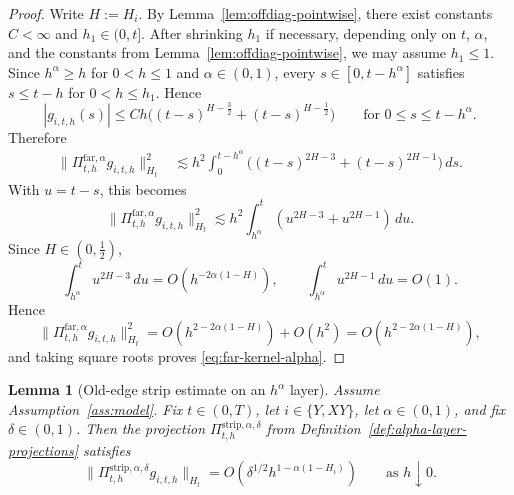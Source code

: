 \documentclass[11pt,a4paper]{amsart}
\theoremstyle{plain}
\newtheorem{lemma}[theorem]{Lemma}
\theoremstyle{definition}
\theoremstyle{remark}
\begin{document}
\begin{proof}
Write \(H:=H_i\). By Lemma~\ref{lem:offdiag-pointwise}, there exist constants
\(C<\infty\) and \(h_1\in(0,t]\). After shrinking \(h_1\) if necessary, depending only on
\(t\), \(\alpha\), and the constants from Lemma~\ref{lem:offdiag-pointwise}, we may assume
\(h_1\le1\). Since \(h^\alpha\ge h\) for \(0<h\le1\) and \(\alpha\in(0,1)\), every
\(s\in[0,t-h^\alpha]\) satisfies \(s\le t-h\) for \(0<h\le h_1\). Hence
\[
|g_{i,t,h}(s)|
\le
Ch\bigl((t-s)^{H-\frac32}+(t-s)^{H-\frac12}\bigr)
\qquad\text{for }0\le s\le t-h^\alpha.
\]
Therefore
\begin{align*}
\|\Pi_{t,h}^{\mathrm{far},\alpha}g_{i,t,h}\|_{H_t}^2
&\lesssim
h^2\int_0^{t-h^\alpha}
\bigl((t-s)^{2H-3}+(t-s)^{2H-1}\bigr)\,ds.
\end{align*}
With \(u=t-s\), this becomes
\[
\|\Pi_{t,h}^{\mathrm{far},\alpha}g_{i,t,h}\|_{H_t}^2
\lesssim
h^2\int_{h^\alpha}^{t}(u^{2H-3}+u^{2H-1})\,du.
\]
Since \(H\in(0,\tfrac12)\),
\[
\int_{h^\alpha}^{t}u^{2H-3}\,du
=
O\!\left(h^{-2\alpha(1-H)}\right),
\qquad
\int_{h^\alpha}^{t}u^{2H-1}\,du
=
O(1).
\]
Hence
\[
\|\Pi_{t,h}^{\mathrm{far},\alpha}g_{i,t,h}\|_{H_t}^2
=
O\!\left(h^{2-2\alpha(1-H)}\right)+O(h^2)
=
O\!\left(h^{2-2\alpha(1-H)}\right),
\]
and taking square roots proves \eqref{eq:far-kernel-alpha}.
\end{proof}

\begin{lemma}[Old-edge strip estimate on an \(h^\alpha\) layer]
\label{lem:strip-kernel-alpha}
Assume Assumption~\ref{ass:model}. Fix \(t\in(0,T)\), let \(i\in\{Y,XY\}\), let
\(\alpha\in(0,1)\), and fix \(\delta\in(0,1)\). Then the projection
\(\Pi_{t,h}^{\mathrm{strip},\alpha,\delta}\) from
Definition~\ref{def:alpha-layer-projections} satisfies
\begin{equation}\label{eq:strip-kernel-alpha}
\|\Pi_{t,h}^{\mathrm{strip},\alpha,\delta}g_{i,t,h}\|_{H_t}
=
O\!\left(\delta^{1/2}h^{1-\alpha(1-H_i)}\right)
\qquad\text{as }h\downarrow0.
\end{equation}
\end{lemma}
\end{document}
